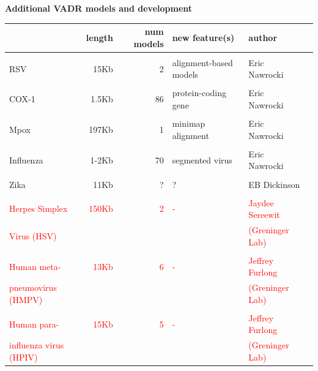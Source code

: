 \documentclass[landscape]{slides}
\begin{document}
\begin{slide}
\begin{center}
  \textbf{Additional VADR models and development}

\small
\begin{tabular}{l|r|r|l|l|l}
 & length & num models & new feature(s) & author\\ \hline
 & & & & & \\ 
RSV & 15Kb & 2 & alignment-based models & Eric Nawrocki \\
 & & & & & \\ 
COX-1 & 1.5Kb & 86 & protein-coding gene & Eric Nawrocki \\
 & & & & & \\ 
Mpox & 197Kb & 1 & minimap alignment & Eric Nawrocki \\
 & & & & & \\ 
Influenza & 1-2Kb & 70 & segmented virus & Eric Nawrocki \\
 & & & & & \\ 
Zika      & 11Kb & ? & ? & EB Dickinson \\
 & & & & & \\ 
\textcolor{red}{Herpes Simplex} & \textcolor{red}{150Kb} & \textcolor{red}{2} & \textcolor{red}{-} & \textcolor{red}{Jaydee Sereewit} \\
\textcolor{red}{Virus (HSV)} &  &  & & \textcolor{red}{(Greninger Lab)} \\
 & & & & & \\ 
\textcolor{red}{Human meta-} & \textcolor{red}{13Kb} & \textcolor{red}{6} & \textcolor{red}{-} & \textcolor{red}{Jeffrey Furlong} \\
\textcolor{red}{pneumovirus (HMPV)} &  &  & & \textcolor{red}{(Greninger Lab)} \\
 & & & & & \\ 
\textcolor{red}{Human para-} & \textcolor{red}{15Kb} & \textcolor{red}{5} & \textcolor{red}{-} & \textcolor{red}{Jeffrey Furlong} \\
\textcolor{red}{influenza virus (HPIV)} &  &  &  & \textcolor{red}{(Greninger Lab)} \\
\end{tabular}

\end{center}
  \vfill
\end{slide}
\end{document}
